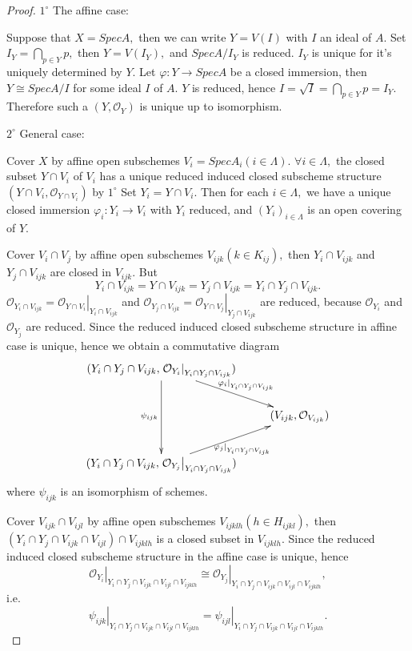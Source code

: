 \begin{proof}
$\mathit{1^{\circ}}$ The affine case:

Suppose that $X=SpecA,$ then we can write $Y=V(I)$ with $I$ an ideal
of $A.$ Set $I_Y=\bigcap\limits_{p\in Y}p,$ then $Y=V(I_Y),$ and
$SpecA/I_Y$ is reduced. $I_Y$ is unique for it's uniquely determined
by $Y.$ Let $\varphi:Y\rightarrow SpecA$ be a closed immersion, then
$Y\cong SpecA/I$ for some ideal $I$ of $A.$ $Y$ is reduced, hence
$I=\sqrt{I}=\bigcap\limits_{p\in Y}p=I_Y.$ Therefore such a
$(Y,\mathcal {O}_Y)$ is unique up to isomorphism.

$\mathit{2^{\circ}}$ General case:

Cover $X$ by affine open subschemes $V_i=SpecA_i(i\in\Lambda).$
$\forall i\in\Lambda,$ the closed subset $Y\cap V_i$ of $V_i$ has a
unique reduced induced closed subscheme structure $(Y\cap
V_i,\mathcal {O}_{Y\cap V_i})$ by $\mathit{1^{\circ}}$ Set
$Y_i=Y\cap V_i.$ Then for each $i\in\Lambda,$ we have a unique
closed immersion $\varphi_i:Y_i\rightarrow V_i$ with $Y_i$ reduced,
and $(Y_i)_{i\in\Lambda}$ is an open covering of $Y.$

Cover $V_i\cap V_j$ by affine open subschemes $V_{ijk}(k\in
K_{ij}),$ then $Y_i\cap V_{ijk}$ and $Y_j\cap V_{ijk}$ are closed in
$V_{ijk}.$ But
$$Y_i\cap V_{ijk}=Y\cap V_{ijk}=Y_j\cap V_{ijk}=Y_i\cap Y_j\cap V_{ijk}.$$
$\mathcal {O}_{Y_i\cap V_{ijk}}=\left.\mathcal {O}_{Y\cap
V_i}\right|_{Y_i\cap V_{ijk}}$ and $\mathcal {O}_{Y_j\cap
V_{ijk}}=\left.\mathcal {O}_{Y\cap V_j}\right|_{Y_j\cap V_{ijk}}$
are reduced, because $\mathcal {O}_{Y_i}$ and $\mathcal {O}_{Y_j}$
are reduced. Since the reduced induced closed subscheme structure in
affine case is unique, hence we obtain a commutative diagram
\[ \xymatrix{
   {(Y_i\cap Y_j\cap V_{ijk},\left.\mathcal {O}_{Y_i}\right|_{Y_i\cap
   Y_j\cap V_{ijk}})} \ar[dd]_{\psi_{ijk}} \ar[dr]^-{\left.\varphi_i\right|_{Y_i\cap
   Y_j\cap V_{ijk}}}                                      \\
   & {(V_{ijk},\mathcal {O}_{V_{ijk}})}                   \\
   {(Y_i\cap Y_j\cap V_{ijk},\left.\mathcal {O}_{Y_j}\right|_{Y_i\cap
   Y_j\cap V_{ijk}})} \ar[ur]_-{\left.\varphi_j\right|_{Y_i\cap Y_j\cap
   V_{ijk}}} }  \]
where $\psi_{ijk}$ is an isomorphism of schemes.

Cover $V_{ijk}\cap V_{ijl}$ by affine open subschemes
$V_{ijklh}(h\in H_{ijkl}),$ then $(Y_i\cap Y_j\cap V_{ijk}\cap
V_{ijl})\cap V_{ijklh}$ is a closed subset in $V_{ijklh}.$ Since the
reduced induced closed subscheme structure in the affine case is
unique, hence
$$\left.\mathcal {O}_{Y_i}\right|_{Y_i\cap Y_j\cap V_{ijk}\cap V_{ijl}\cap V_{ijklh}}\cong
\left.\mathcal {O}_{Y_j}\right|_{Y_i\cap Y_j\cap V_{ijk}\cap
V_{ijl}\cap V_{ijklh}},$$ i.e.
$$\left.\psi_{ijk}\right|_{Y_i\cap Y_j\cap V_{ijk}\cap V_{ijl}\cap V_{ijklh}}=
\left.\psi_{ijl}\right|_{Y_i\cap Y_j\cap V_{ijk}\cap V_{ijl}\cap
V_{ijklh}}.$$


\end{proof}
